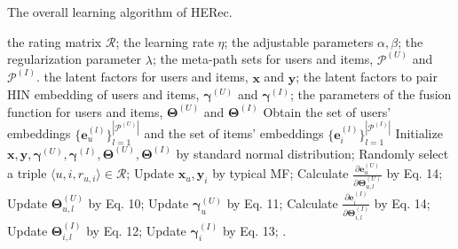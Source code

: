 \begin{algorithm}[htb]
\caption{The overall learning algorithm of HERec.}
\label{alg_herec}
\begin{algorithmic}[1]
\Require

the rating matrix $\mathcal{R}$;
the learning rate $\eta$;
the adjustable parameters $\alpha, \beta$;
the regularization parameter $\lambda$;
the meta-path sets for users and items, $\mathcal{P}^{(U)}$ and $\mathcal{P}^{(I)}$.
\Ensure
the latent factors for users and items, $\mathbf{x}$ and $\mathbf{y}$;
the latent factors to pair HIN embedding of users and items, $\bm{{\gamma}}^{(U)}$ and $\bm{{\gamma}}^{(I)}$;
the parameters of the fusion function for users and items, $\bm{\Theta}^{(U)}$  and $\bm{\Theta}^{(I)}$
\State Obtain the set of users' embeddings $\{ \bm{e}^{(l)}_u \}_{l=1}^{|\mathcal{P}^{(U)}|}$ and the set of items' embeddings $\{ \bm{e}^{(l)}_i \}_{l=1}^{|\mathcal{P}^{(I)}|}$
\State Initialize $\mathbf{x}, \mathbf{y}, \bm{{\gamma}}^{(U)}, \bm{{\gamma}}^{(I)}, \bm{\Theta}^{(U)}, \bm{\Theta}^{(I)}$ by standard normal distribution;
    \State Randomly select a triple $\langle u, i, r_{u,i}\rangle \in \mathcal{R}$;
    \State Update  $\mathbf{x}_u, \mathbf{y}_i$ by typical MF;
        \State Calculate $\frac{\partial{\bm{e}_{u}^{(U)}}}{\partial{\bm{\Theta}_{u,l}^{(U)}}}$ by Eq. 14;
        \State Update  $\bm{\Theta}_{u,l}^{(U)}$ by Eq. 10;
    \EndFor
    \State Update $\bm{\gamma}_u^{(U)}$ by Eq. 11;
        \State Calculate $\frac{\partial{\bm{e}_{i}^{(I)}}}{\partial{\bm{\Theta}_{i,l}^{(I)}}}$ by Eq. 14;
        \State Update  $\bm{\Theta}_{i,l}^{(I)}$ by Eq. 12;
    \EndFor
    \State Update $\bm{\gamma}_i^{(I)}$ by Eq. 13;
\EndWhile
\State {}.
\end{algorithmic}
\end{algorithm}


